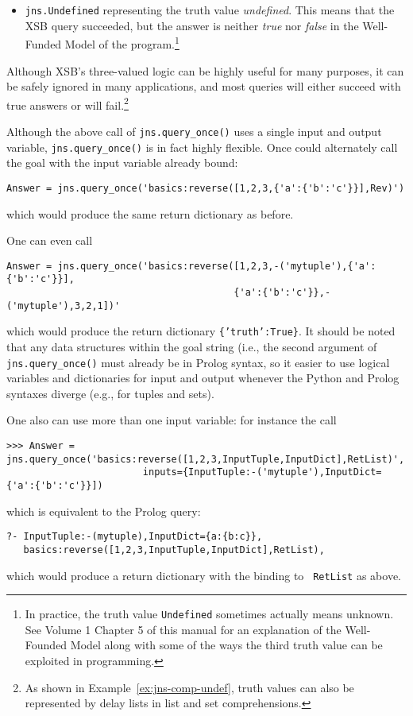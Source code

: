 \begin{example}
\begin{itemize}
  means the XSB query failed and has no answers in the Well-Founded
  Model of the program.  In such a case, the return dictionary has the form
\begin{verbatim}
{truth:False}
\end{verbatim}
\item {\tt jns.Undefined} representing the truth value {\em
  undefined}. This means that the XSB query succeeded, but the answer
  is neither {\em true} nor {\em false} in the Well-Funded Model of
  the program.\footnote{In practice, the truth value {\tt Undefined}
  sometimes actually means unknown. See Volume 1 Chapter 5 of this
  manual for an explanation of the Well-Founded Model along with some
  of the ways the third truth value can be exploited in programming.}
\end{itemize}
\noindent
Although XSB's three-valued logic can be highly useful for many
purposes, it can be safely ignored in many applications, and most
queries will either succeed with true answers or will
fail.\footnote{As shown in Example~\ref{ex:jns-comp-undef}, truth
  values can also be represented by delay lists in list and set
  comprehensions.}


Although the above call of {\tt jns.query\_once()} uses a single input
and output variable, {\tt jns.query\_once()} is in fact highly
flexible.  Once could alternately call the goal with the input
variable already bound:
\begin{verbatim}
Answer = jns.query_once('basics:reverse([1,2,3,{'a':{'b':'c'}}],Rev)')
\end{verbatim}
which would produce the same return dictionary as before.

One can even call 
\begin{verbatim}
Answer = jns.query_once('basics:reverse([1,2,3,-('mytuple'),{'a':{'b':'c'}}],
                                        {'a':{'b':'c'}},-('mytuple'),3,2,1])'
\end{verbatim}
which would produce the return dictionary {\tt \{'truth':True\}}.  It
should be noted that any data structures within the goal string (i.e.,
the second argument of {\tt jns.query\_once()} must already be in
  Prolog syntax, so it easier to use logical variables and
  dictionaries for input and output whenever the Python and Prolog
  syntaxes diverge (e.g., for tuples and sets).

One also can use more than one input variable: for instance the call
\begin{verbatim}
>>> Answer = jns.query_once('basics:reverse([1,2,3,InputTuple,InputDict],RetList)',
                        inputs={InputTuple:-('mytuple'),InputDict={'a':{'b':'c'}}])
\end{verbatim}
which is equivalent to the Prolog query:
\begin{verbatim}
?- InputTuple:-(mytuple),InputDict={a:{b:c}},
   basics:reverse([1,2,3,InputTuple,InputDict],RetList),
\end{verbatim}
which would produce a return dictionary with the binding to {\tt
  RetList} as above.
\end{example}

